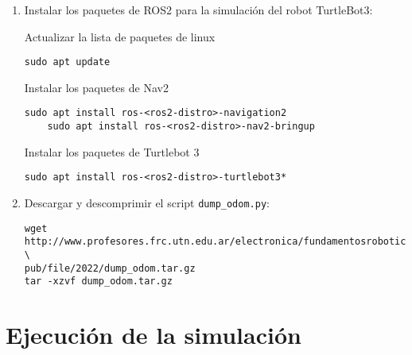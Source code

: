 \documentclass[tp]{lcc}
\begin{document}
\begin{enumerate}

\item Instalar los paquetes de ROS2 para la simulación del robot TurtleBot3:

Actualizar la lista de paquetes de linux
\begin{lstlisting}[style=bash] 
    sudo apt update
\end{lstlisting}

Instalar los paquetes de Nav2 
\begin{lstlisting}[style=bash] 
	sudo apt install ros-<ros2-distro>-navigation2
	sudo apt install ros-<ros2-distro>-nav2-bringup
\end{lstlisting}

Instalar los paquetes de Turtlebot 3
\begin{lstlisting}[style=bash] 
	sudo apt install ros-<ros2-distro>-turtlebot3*
\end{lstlisting}

	\item Descargar y descomprimir el script \lstinline[style=bash]{dump_odom.py}:
	
\begin{lstlisting}[style=bash] 
wget http://www.profesores.frc.utn.edu.ar/electronica/fundamentosroboticamovil/ \
pub/file/2022/dump_odom.tar.gz
tar -xzvf dump_odom.tar.gz
\end{lstlisting}
	
\end{enumerate}

\section{Ejecución de la simulación}
\end{document}
